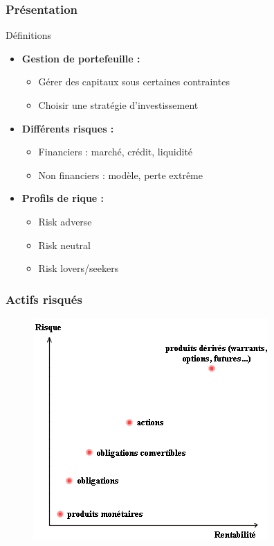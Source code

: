 
\begin{frame}
    \frametitle{Présentation}
    \begin{block}{Définitions}
	\begin{itemize}
	\item \textbf{Gestion de portefeuille :}
	      \begin{itemize}
	      \item Gérer des capitaux sous certaines contraintes
	      \item Choisir une stratégie d'investissement
	      \end{itemize}
	\item \textbf{Différents risques :}
	      \begin{itemize}
	      \item Financiers : marché, crédit, liquidité
	      \item Non financiers : modèle, perte extrême
	      \end{itemize}
	\item \textbf{Profils de rique :}
	      \begin{itemize}
	      \item Risk adverse
	      \item Risk neutral
	      \item Risk lovers/seekers
	      \end{itemize}
	\end{itemize}
    \end{block}


\end{frame}

\begin{frame}
    \frametitle{Actifs risqués}
	  \begin{figure}
	      \includegraphics[scale=0.5]{images/actifsRisques.png}   
	  \end{figure}   
\end{frame}


